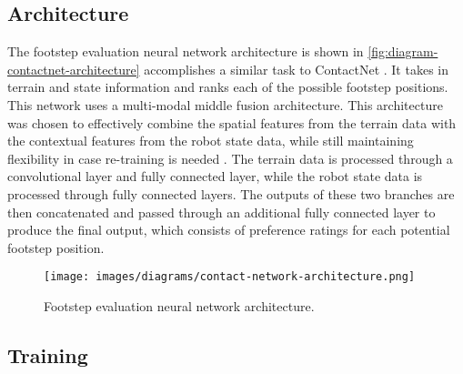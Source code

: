 

\subsection{Architecture}

The footstep evaluation neural network architecture is shown in
\autoref{fig:diagram-contactnet-architecture} accomplishes a similar
task to ContactNet \cite{bratta_contactnet_2024}. It takes in terrain
and state information and ranks each of the possible footstep
positions. This network uses a multi-modal middle fusion
architecture. This architecture was chosen to effectively combine the
spatial features from the terrain data with the contextual features
from the robot state data, while still maintaining flexibility in
case re-training is needed \cite{feng2021deep}. The terrain data is
processed through a convolutional layer and fully connected layer,
while the robot state data is processed through fully connected
layers. The outputs of these two branches are then concatenated and
passed through an additional fully connected layer to produce the
final output, which consists of preference ratings for each potential
footstep position.

\begin{figure}
  \centering
  \texttt{[image: images/diagrams/contact-network-architecture.png]}
  \caption{Footstep evaluation neural network architecture.}
  \label{fig:diagram-contactnet-architecture}
\end{figure}

\subsection{Training}

